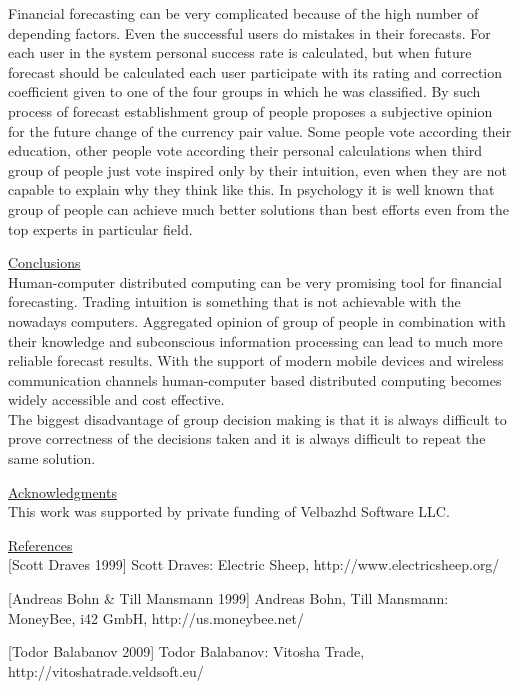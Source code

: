 \documentclass{article}
\begin{document}
Financial forecasting can be very complicated because of the high number of depending factors. Even the successful users do mistakes in their forecasts. For each user in the system personal success rate is calculated, but when future forecast should be calculated each user participate with its rating and correction coefficient given to one of the four groups in which he was classified. By such process of forecast establishment group of people proposes a subjective opinion for the future change of the currency pair value. Some people vote according their education, other people vote according their personal calculations when third group of people just vote inspired only by their intuition, even when they are not capable to explain why they think like this. In psychology it is well known that group of people can achieve much better solutions than best efforts even from the top experts in particular field. 

\vspace*{3mm}
\underline{Conclusions} \\

Human-computer distributed computing can be very promising tool for financial forecasting. Trading intuition is something that is not achievable with the nowadays computers. Aggregated opinion of group of people in combination with their knowledge and subconscious information processing can lead to much more reliable forecast results. With the support of modern mobile devices and wireless communication channels human-computer based distributed computing becomes widely accessible and cost effective. \\

The biggest disadvantage of group decision making is that it is always difficult to prove correctness of the decisions taken and it is always difficult to repeat the same solution. 

\vspace*{3mm}
\underline{Acknowledgments} \\

This work was supported by private funding of Velbazhd Software LLC.

\vspace*{3mm}
\underline{References} \\

[Scott Draves 1999] Scott Draves: Electric Sheep, http://www.electricsheep.org/
\vspace*{2mm}

[Andreas Bohn \& Till Mansmann 1999] Andreas Bohn, Till Mansmann: MoneyBee, i42 GmbH, http://us.moneybee.net/
\vspace*{2mm}

[Todor Balabanov 2009] Todor Balabanov: Vitosha Trade, http://vitoshatrade.veldsoft.eu/
\vspace*{2mm}
\end{document}
